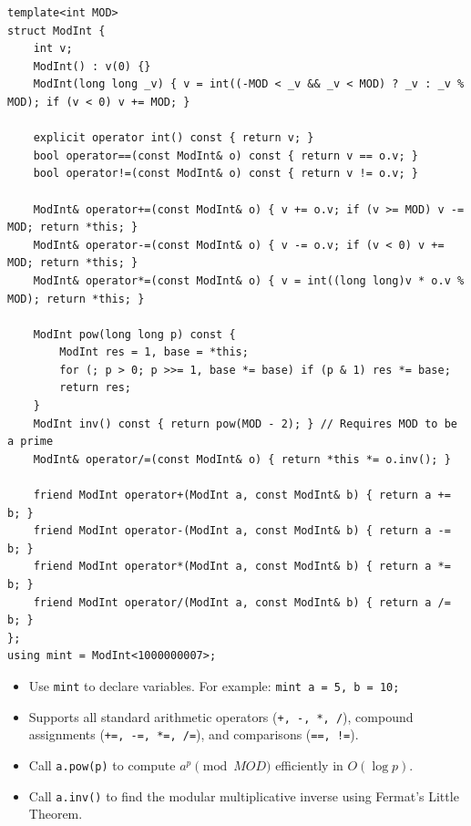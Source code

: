 
\begin{lstlisting}
template<int MOD>
struct ModInt {
    int v;
    ModInt() : v(0) {}
    ModInt(long long _v) { v = int((-MOD < _v && _v < MOD) ? _v : _v % MOD); if (v < 0) v += MOD; }
    
    explicit operator int() const { return v; }
    bool operator==(const ModInt& o) const { return v == o.v; }
    bool operator!=(const ModInt& o) const { return v != o.v; }
    
    ModInt& operator+=(const ModInt& o) { v += o.v; if (v >= MOD) v -= MOD; return *this; }
    ModInt& operator-=(const ModInt& o) { v -= o.v; if (v < 0) v += MOD; return *this; }
    ModInt& operator*=(const ModInt& o) { v = int((long long)v * o.v % MOD); return *this; }
    
    ModInt pow(long long p) const {
        ModInt res = 1, base = *this;
        for (; p > 0; p >>= 1, base *= base) if (p & 1) res *= base;
        return res;
    }
    ModInt inv() const { return pow(MOD - 2); } // Requires MOD to be a prime
    ModInt& operator/=(const ModInt& o) { return *this *= o.inv(); }
    
    friend ModInt operator+(ModInt a, const ModInt& b) { return a += b; }
    friend ModInt operator-(ModInt a, const ModInt& b) { return a -= b; }
    friend ModInt operator*(ModInt a, const ModInt& b) { return a *= b; }
    friend ModInt operator/(ModInt a, const ModInt& b) { return a /= b; }
};
using mint = ModInt<1000000007>;
\end{lstlisting}

\begin{itemize}
    \item Use \lstinline|mint| to declare variables. For example: \lstinline|mint a = 5, b = 10;|
    \item Supports all standard arithmetic operators (\lstinline|+, -, *, /|), compound assignments (\lstinline|+=, -=, *=, /=|), and comparisons (\lstinline|==, !=|).
    \item Call \lstinline|a.pow(p)| to compute $a^p \pmod{MOD}$ efficiently in $O(\log p)$.
    \item Call \lstinline|a.inv()| to find the modular multiplicative inverse using Fermat's Little Theorem.
\end{itemize}

